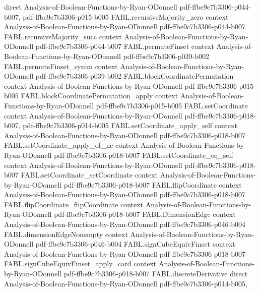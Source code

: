 \begin{theorem}
  {direct}
  {Analysis-of-Boolean-Functions-by-Ryan-ODonnell}
  {pdf-ffbe9c7b3306-p044-b007,
    pdf-ffbe9c7b3306-p015-b005}
\proofstep
  {FABL.recursiveMajority_zero}
  {context}
  {Analysis-of-Boolean-Functions-by-Ryan-ODonnell}
  {pdf-ffbe9c7b3306-p044-b007}
\proofstep
  {FABL.recursiveMajority_succ}
  {context}
  {Analysis-of-Boolean-Functions-by-Ryan-ODonnell}
  {pdf-ffbe9c7b3306-p044-b007}
\proofstep
  {FABL.permuteFinset}
  {context}
  {Analysis-of-Boolean-Functions-by-Ryan-ODonnell}
  {pdf-ffbe9c7b3306-p039-b002}
\proofstep
  {FABL.permuteFinset_symm}
  {context}
  {Analysis-of-Boolean-Functions-by-Ryan-ODonnell}
  {pdf-ffbe9c7b3306-p039-b002}
\proofstep
  {FABL.blockCoordinatePermutation}
  {context}
  {Analysis-of-Boolean-Functions-by-Ryan-ODonnell}
  {pdf-ffbe9c7b3306-p015-b005}
\proofstep
  {FABL.blockCoordinatePermutation_apply}
  {context}
  {Analysis-of-Boolean-Functions-by-Ryan-ODonnell}
  {pdf-ffbe9c7b3306-p015-b005}
\proofstep
  {FABL.setCoordinate}
  {context}
  {Analysis-of-Boolean-Functions-by-Ryan-ODonnell}
  {pdf-ffbe9c7b3306-p018-b007,
    pdf-ffbe9c7b3306-p014-b005}
\proofstep
  {FABL.setCoordinate_apply_self}
  {context}
  {Analysis-of-Boolean-Functions-by-Ryan-ODonnell}
  {pdf-ffbe9c7b3306-p018-b007}
\proofstep
  {FABL.setCoordinate_apply_of_ne}
  {context}
  {Analysis-of-Boolean-Functions-by-Ryan-ODonnell}
  {pdf-ffbe9c7b3306-p018-b007}
\proofstep
  {FABL.setCoordinate_eq_self}
  {context}
  {Analysis-of-Boolean-Functions-by-Ryan-ODonnell}
  {pdf-ffbe9c7b3306-p018-b007}
\proofstep
  {FABL.setCoordinate_setCoordinate}
  {context}
  {Analysis-of-Boolean-Functions-by-Ryan-ODonnell}
  {pdf-ffbe9c7b3306-p018-b007}
\proofstep
  {FABL.flipCoordinate}
  {context}
  {Analysis-of-Boolean-Functions-by-Ryan-ODonnell}
  {pdf-ffbe9c7b3306-p018-b007}
\proofstep
  {FABL.flipCoordinate_flipCoordinate}
  {context}
  {Analysis-of-Boolean-Functions-by-Ryan-ODonnell}
  {pdf-ffbe9c7b3306-p018-b007}
\proofstep
  {FABL.DimensionEdge}
  {context}
  {Analysis-of-Boolean-Functions-by-Ryan-ODonnell}
  {pdf-ffbe9c7b3306-p046-b004}
\proofstep
  {FABL.dimensionEdgeNonempty}
  {context}
  {Analysis-of-Boolean-Functions-by-Ryan-ODonnell}
  {pdf-ffbe9c7b3306-p046-b004}
\proofstep
  {FABL.signCubeEquivFinset}
  {context}
  {Analysis-of-Boolean-Functions-by-Ryan-ODonnell}
  {pdf-ffbe9c7b3306-p018-b007}
\proofstep
  {FABL.signCubeEquivFinset_apply_card}
  {context}
  {Analysis-of-Boolean-Functions-by-Ryan-ODonnell}
  {pdf-ffbe9c7b3306-p018-b007}
\proofstep
  {FABL.discreteDerivative}
  {direct}
  {Analysis-of-Boolean-Functions-by-Ryan-ODonnell}
  {pdf-ffbe9c7b3306-p014-b005,
}
\end{theorem}
